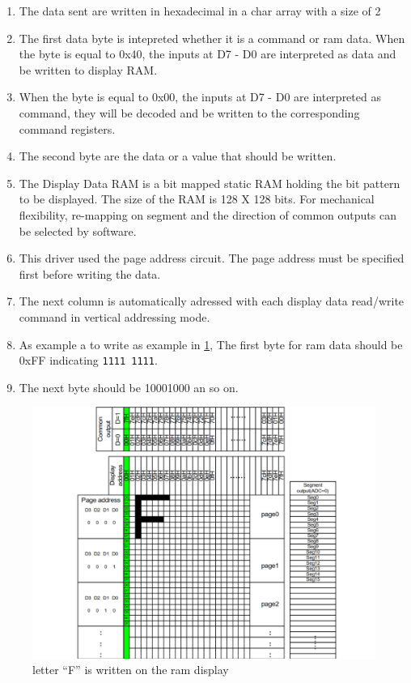 \begin{enumerate}
	\item The data sent are written in hexadecimal in a char array with a size of 2
	\item The first data byte is intepreted whether it is a command or ram data.  When the byte is equal to 0x40, the inputs at D7 - D0 are interpreted as data and be written to display RAM.
	\item When the byte is equal to 0x00, the inputs at D7 - D0 are interpreted as command, they will
	be decoded and be written to the corresponding command registers.
	\item The second byte are the data or a value that should be written.
	\item The Display Data RAM is a bit mapped static RAM holding the bit pattern to be displayed. The size of the RAM is 128 X 128 bits.
	For mechanical flexibility, re-mapping on segment and the direction of common outputs can be selected by software.
	\item This driver used the page address circuit. The page address must be specified first before writing the data.
	\item The next column is automatically adressed with each display data read/write command in vertical addressing mode.
	\item As example a to write as example in \ref{fig:fig1}, The first byte for ram data should be 0xFF indicating \verb|1111 1111|.
	\item The next byte should be  10001000 an so on.
\end{enumerate}

\begin{figure}
	\centering
	\includegraphics[width=.8\linewidth]{sh1107ram.png}
	\caption{letter ``F'' is written on the ram display}\label{fig:fig1}
\end{figure}

